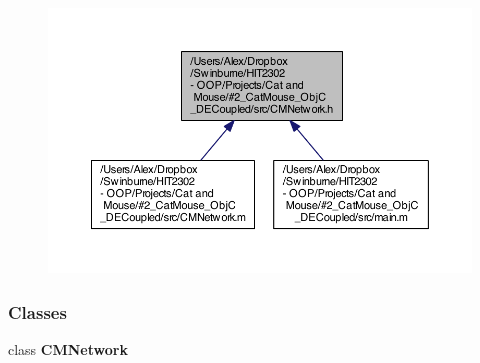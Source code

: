 \begin{figure}[H]
\begin{center}
\leavevmode
\includegraphics[width=350pt]{_c_m_network_8h__dep__incl}
\end{center}
\end{figure}
\subsubsection*{Classes}
\begin{DoxyCompactItemize}
\item 
class {\bf C\-M\-Network}
\end{DoxyCompactItemize}
